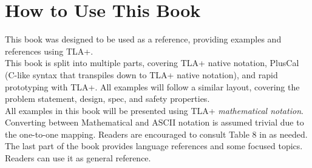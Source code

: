 \section{How to Use This Book}

This book was designed to be used as a reference, providing examples
and references using TLA+.\\

This book is split into multiple parts, covering TLA+ native notation, PlusCal
(C-like syntax that transpiles down to TLA+ native notation), and rapid
prototyping with TLA+. All examples will follow a similar layout, covering the
problem statement, design, spec, and safety properties.\\

All examples in this book will be presented using TLA+ \textit{mathematical
notation}. Converting between Mathematical and ASCII notation is assumed trivial
due to the one-to-one mapping. Readers are encouraged to consult Table 8 in
\cite{ss} as needed.\\

The last part of the book provides language references and some focused topics.
Readers can use it as general reference. 
